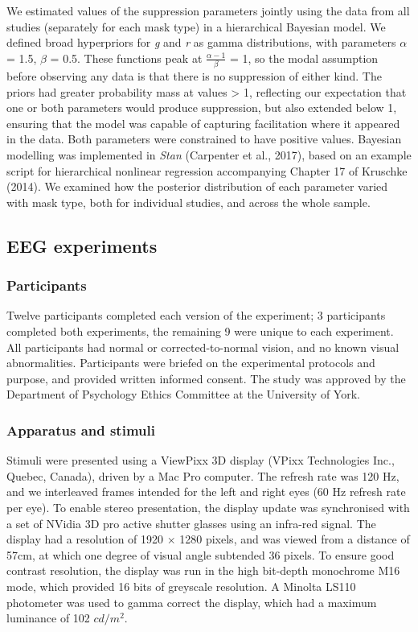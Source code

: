 \documentclass[]{article}
\begin{document}
We estimated values of the suppression parameters jointly using the data from all studies (separately for each mask type) in a hierarchical Bayesian model. We defined broad hyperpriors for \emph{g} and \emph{r} as gamma distributions, with parameters \(\alpha\) = 1.5, \(\beta\) = 0.5. These functions peak at \(\frac{\alpha-1}{\beta}\) = 1, so the modal assumption before observing any data is that there is no suppression of either kind. The priors had greater probability mass at values \textgreater{} 1, reflecting our expectation that one or both parameters would produce suppression, but also extended below 1, ensuring that the model was capable of capturing facilitation where it appeared in the data. Both parameters were constrained to have positive values. Bayesian modelling was implemented in \emph{Stan} (Carpenter et al., 2017), based on an example script for hierarchical nonlinear regression accompanying Chapter 17 of Kruschke (2014). We examined how the posterior distribution of each parameter varied with mask type, both for individual studies, and across the whole sample.

\hypertarget{eeg-experiments}{%
\subsection{EEG experiments}\label{eeg-experiments}}

\hypertarget{participants}{%
\subsubsection{Participants}\label{participants}}

Twelve participants completed each version of the experiment; 3 participants completed both experiments, the remaining 9 were unique to each experiment. All participants had normal or corrected-to-normal vision, and no known visual abnormalities. Participants were briefed on the experimental protocols and purpose, and provided written informed consent. The study was approved by the Department of Psychology Ethics Committee at the University of York.

\hypertarget{apparatus-and-stimuli}{%
\subsubsection{Apparatus and stimuli}\label{apparatus-and-stimuli}}

Stimuli were presented using a ViewPixx 3D display (VPixx Technologies Inc., Quebec, Canada), driven by a Mac Pro computer. The refresh rate was 120 Hz, and we interleaved frames intended for the left and right eyes (60 Hz refresh rate per eye). To enable stereo presentation, the display update was synchronised with a set of NVidia 3D pro active shutter glasses using an infra-red signal. The display had a resolution of 1920 \(\times\) 1280 pixels, and was viewed from a distance of 57cm, at which one degree of visual angle subtended 36 pixels. To ensure good contrast resolution, the display was run in the high bit-depth monochrome M16 mode, which provided 16 bits of greyscale resolution. A Minolta LS110 photometer was used to gamma correct the display, which had a maximum luminance of 102 \(cd/m^2\).
\end{document}
